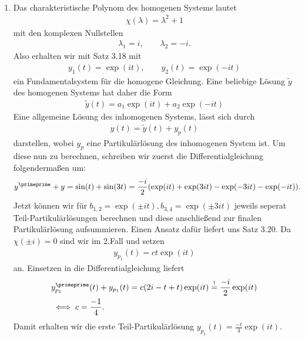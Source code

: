 \begin{solution}
\leavevmode \\
\begin{enumerate}[label = \textbf{\alph*)}]
  \item Das charakteristische Polynom des homogenen Systems lautet
  \begin{align*}
    \chi(\lambda) = \lambda^2 + 1
  \end{align*}
  mit den komplexen Nullstellen
  \begin{align*}
    \lambda_1 = i, \qquad \lambda_2 = -i.
  \end{align*}
  Also erhalten wir mit Satz 3.18 mit
  \begin{align*}
    y_1(t) = \exp(it), \qquad y_2(t) = \exp(-it)
  \end{align*}
  ein Fundamentalsystem für die homogene Gleichung.
  Eine beliebige Lösung $\widetilde{y}$ des homogenen Systems hat daher die Form
  \begin{align*}
    \widetilde{y}(t) = a_1\exp(it) + a_2\exp(-it)
  \end{align*}
  Eine allgemeine Lösung des inhomogenen Systems, lässt sich durch
  \begin{align*}
    y(t) = \widetilde{y}(t) + y_p(t)
  \end{align*}
  darstellen, wobei $y_p$ eine Partikulärlösung des inhomogenen System ist.
  Um diese nun zu berechnen, schreiben wir zuerst die Differentialgleichung folgendermaßen um:
  \begin{align*}
    y^{\primeprime} + y &= \sin(t) + \sin(3t)
    = \frac{-i}{2}(\exp(it) + \exp(3it) - \exp(-3it) - \exp(-it)).
  \end{align*}
  Jetzt können wir für $b_{1,2} = \exp(\pm it), b_{3,4} = \exp(\pm 3it)$
  jeweils seperat Teil-Partikulärlösungen berechnen und diese anschließend zur finalen Partikulärlösung
  aufsummieren. Einen Ansatz dafür liefert uns Satz 3.20. Da $\chi(\pm i) = 0$ sind wir im 2.Fall und
  setzen
  \begin{align*}
    y_{p_1}(t) = ct\exp(it)
  \end{align*}
  an. Einsetzen in die Differentialgleichung liefert
  \begin{align*}
    &y_{p_1}^{\primeprime}(t) + y_{p_1}(t) = c(2i - t + t)\exp(it)\stackrel{!}{=}
    \frac{-i}{2}\exp(it) \\
    &\iff c = \frac{-1}{4}.
  \end{align*}
  Damit erhalten wir die erste Teil-Partikulärlösung $y_{p_1}(t) = \frac{-t}{4}\exp(it)$. \\

\end{enumerate}
\end{solution}
